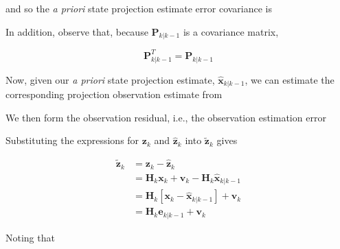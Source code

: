and so the \textit{a priori} state projection estimate error covariance is


In addition, observe that, because $\mathbf{P}_{k|k-1}$ is a covariance matrix,

\begin{equation*}
    \mathbf{P}_{k|k-1}^T = \mathbf{P}_{k|k-1}
\end{equation*}

Now, given our \textit{a priori} state projection estimate, $\hat{\mathbf{x}}_{k|k-1}$,
we can estimate the corresponding projection observation estimate from


We then form the observation residual, i.e., the observation estimation error


Substituting the expressions for $\mathbf{z}_k$ and $\hat{\mathbf{z}}_k$ into $\tilde{\mathbf{z}}_k$ gives

\begin{equation*}
    \begin{aligned}
        \tilde{\mathbf{z}}_k &= \mathbf{z}_k - \hat{\mathbf{z}}_k \\
        &= \mathbf{H}_k \mathbf{x}_k + \mathbf{v}_k - \mathbf{H}_k \hat{\mathbf{x}}_{k|k-1} \\
        &= \mathbf{H}_k \left[ \mathbf{x}_k - \hat{\mathbf{x}}_{k|k-1} \right] + \mathbf{v}_k \\
        &= \mathbf{H}_k \mathbf{e}_{k|k-1} + \mathbf{v}_k
    \end{aligned}
\end{equation*}

Noting that

